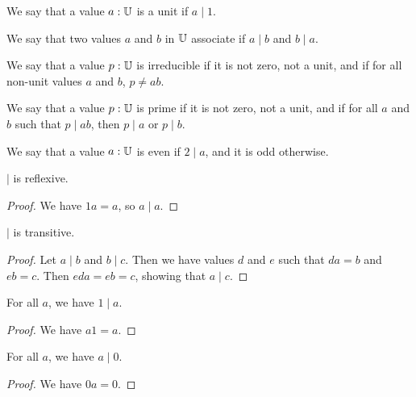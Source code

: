 \documentclass[../../math.tex]{subfiles}
\begin{document}
\begin{definition}
    We say that a value $a : \mathbb{U}$ is a unit if $a \mid 1$.
\end{definition}

\begin{definition}
    We say that two values $a$ and $b$ in $\mathbb{U}$ associate if $a \mid b$ and $b
    \mid a$.
\end{definition}

\begin{definition}
    We say that a value $p : \mathbb{U}$ is irreducible if it is not zero, not a unit,
    and if for all non-unit values $a$ and $b$, $p \neq ab$.
\end{definition}

\begin{definition}
    We say that a value $p : \mathbb{U}$ is prime if it is not zero, not a unit, and if
    for all $a$ and $b$ such that $p \mid ab$, then $p \mid a$ or $p \mid b$.
\end{definition}

\begin{definition}
    We say that a value $a : \mathbb{U}$ is even if $2 \mid a$, and it is odd otherwise.
\end{definition}

\begin{instance}
    $\mid$ is reflexive.
\end{instance}
\begin{proof}
    We have $1a = a$, so $a \mid a$.
\end{proof}

\begin{instance}
    $\mid$ is transitive.
\end{instance}
\begin{proof}
    Let $a \mid b$ and $b \mid c$.  Then we have values $d$ and $e$ such that
    $da = b$ and $eb = c$.  Then $eda = eb = c$, showing that $a \mid c$.
\end{proof}

\begin{theorem} \label{one_divides}
    For all $a$, we have $1 \mid a$.
\end{theorem}
\begin{proof}
    We have $a1 = a$.
\end{proof}

\begin{theorem} \label{divides_zero}
    For all $a$, we have $a \mid 0$.
\end{theorem}
\begin{proof}
    We have $0a = 0$.
\end{proof}
\end{document}
